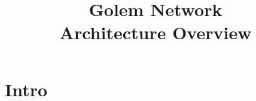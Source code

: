 \documentclass[12pt]{article}
\title{Golem Network \\ Architecture Overview}
\begin{document}
\maketitle{}

\section{Intro}
\end{document}
